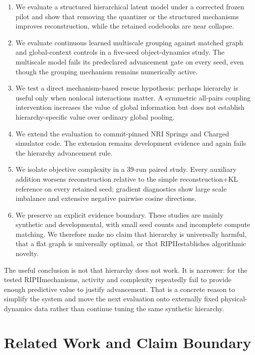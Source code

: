 \documentclass[10pt]{article}
\newcommand{\RIPII}{\textsc{RIPII}}
\begin{document}
\begin{enumerate}
    \item We evaluate a structured hierarchical latent model under a corrected frozen pilot and show that removing the quantizer or the structured mechanisms improves reconstruction, while the retained codebooks are near collapse.
    \item We evaluate continuous learned multiscale grouping against matched graph and global-context controls in a five-seed object-dynamics study. The multiscale model fails its predeclared advancement gate on every seed, even though the grouping mechanism remains numerically active.
    \item We test a direct mechanism-based rescue hypothesis: perhaps hierarchy is useful only when nonlocal interactions matter. A symmetric all-pairs coupling intervention increases the value of global information but does not establish hierarchy-specific value over ordinary global pooling.
    \item We extend the evaluation to commit-pinned NRI Springs and Charged simulator code. The extension remains development evidence and again fails the hierarchy advancement rule.
    \item We isolate objective complexity in a 39-run paired study. Every auxiliary addition worsens reconstruction relative to the simple reconstruction+KL reference on every retained seed; gradient diagnostics show large scale imbalance and extensive negative pairwise cosine directions.
    \item We preserve an explicit evidence boundary. These studies are mainly synthetic and developmental, with small seed counts and incomplete compute matching. We therefore make no claim that hierarchy is universally harmful, that a flat graph is universally optimal, or that \RIPII establishes algorithmic novelty.
\end{enumerate}

The useful conclusion is not that hierarchy does not work. It is narrower: for the tested \RIPII mechanisms, activity and complexity repeatedly fail to provide enough predictive value to justify advancement. That is a concrete reason to simplify the system and move the next evaluation onto externally fixed physical-dynamics data rather than continue tuning the same synthetic hierarchy.

\section{Related Work and Claim Boundary}
\end{document}
